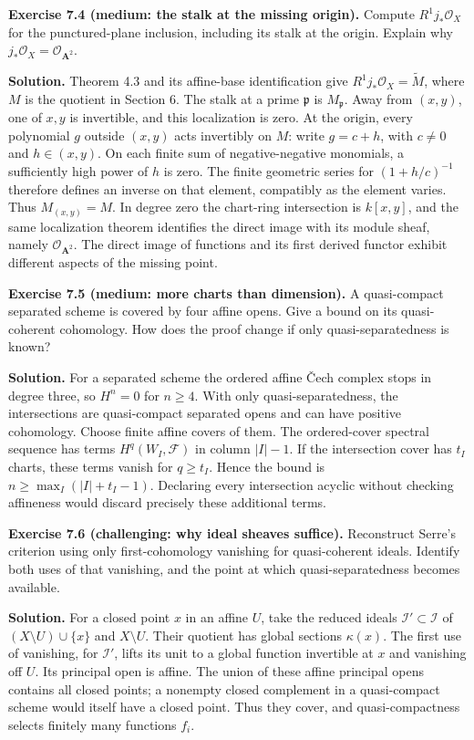 \documentclass[11pt]{article}
\begin{document}
\textbf{Exercise 7.4 (medium: the stalk at the missing origin).} Compute
\(R^1j_*\mathcal O_X\) for the punctured-plane inclusion, including its
stalk at the origin. Explain why
\(j_*\mathcal O_X=\mathcal O_{\mathbf A^2}\).

\textbf{Solution.} Theorem 4.3 and its affine-base identification give
\(R^1j_*\mathcal O_X=\widetilde M\), where \(M\) is the quotient in
Section 6. The stalk at a prime \(\mathfrak p\) is \(M_{\mathfrak p}\).
Away from \((x,y)\), one of \(x,y\) is invertible, and this localization
is zero. At the origin, every polynomial \(g\) outside \((x,y)\) acts
invertibly on \(M\): write \(g=c+h\), with \(c\ne0\) and \(h\in(x,y)\).
On each finite sum of negative-negative monomials, a sufficiently high
power of \(h\) is zero. The finite geometric series for \((1+h/c)^{-1}\)
therefore defines an inverse on that element, compatibly as the element
varies. Thus \(M_{(x,y)}=M\). In degree zero the chart-ring intersection
is \(k[x,y]\), and the same localization theorem identifies the direct
image with its module sheaf, namely \(\mathcal O_{\mathbf A^2}\). The
direct image of functions and its first derived functor exhibit
different aspects of the missing point.

\textbf{Exercise 7.5 (medium: more charts than dimension).} A
quasi-compact separated scheme is covered by four affine opens. Give a
bound on its quasi-coherent cohomology. How does the proof change if
only quasi-separatedness is known?

\textbf{Solution.} For a separated scheme the ordered affine Čech
complex stops in degree three, so \(H^n=0\) for \(n\ge4\). With only
quasi-separatedness, the intersections are quasi-compact separated opens
and can have positive cohomology. Choose finite affine covers of them.
The ordered-cover spectral sequence has terms \(H^q(W_I,\mathcal F)\) in
column \(|I|-1\). If the intersection cover has \(t_I\) charts, these
terms vanish for \(q\ge t_I\). Hence the bound is
\(n\ge\max_I(|I|+t_I-1)\). Declaring every intersection acyclic without
checking affineness would discard precisely these additional terms.

\textbf{Exercise 7.6 (challenging: why ideal sheaves suffice).}
Reconstruct Serre's criterion using only first-cohomology vanishing for
quasi-coherent ideals. Identify both uses of that vanishing, and the
point at which quasi-separatedness becomes available.

\textbf{Solution.} For a closed point \(x\) in an affine \(U\), take the
reduced ideals \(\mathcal I'\subset\mathcal I\) of
\((X\setminus U)\cup\{x\}\) and \(X\setminus U\). Their quotient has
global sections \(\kappa(x)\). The first use of vanishing, for
\(\mathcal I'\), lifts its unit to a global function invertible at \(x\)
and vanishing off \(U\). Its principal open is affine. The union of
these affine principal opens contains all closed points; a nonempty
closed complement in a quasi-compact scheme would itself have a closed
point. Thus they cover, and quasi-compactness selects finitely many
functions \(f_i\).
\end{document}
